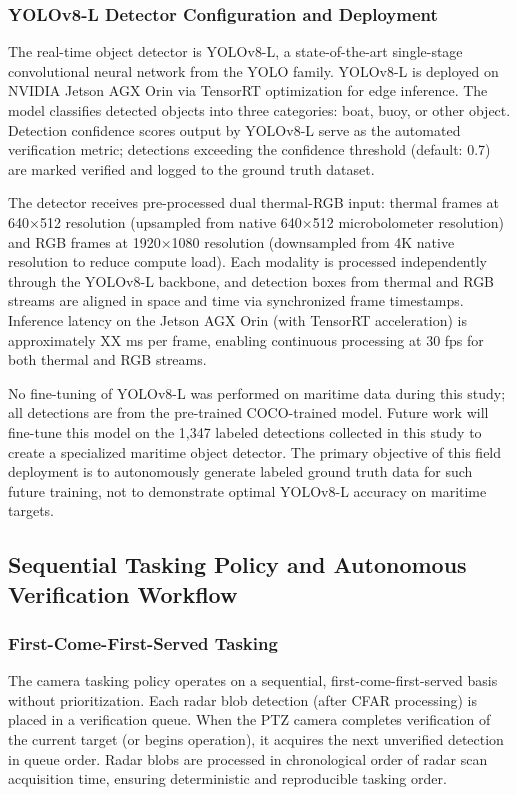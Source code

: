 \documentclass[conf]{asmeconf}
\begin{document}
\subsubsection{YOLOv8-L Detector Configuration and Deployment}

The real-time object detector is YOLOv8-L, a state-of-the-art single-stage convolutional neural network from the YOLO family. YOLOv8-L is deployed on NVIDIA Jetson AGX Orin via TensorRT optimization for edge inference. The model classifies detected objects into three categories: boat, buoy, or other object. Detection confidence scores output by YOLOv8-L serve as the automated verification metric; detections exceeding the confidence threshold (default: 0.7) are marked verified and logged to the ground truth dataset.

The detector receives pre-processed dual thermal-RGB input: thermal frames at 640×512 resolution (upsampled from native 640×512 microbolometer resolution) and RGB frames at 1920×1080 resolution (downsampled from 4K native resolution to reduce compute load). Each modality is processed independently through the YOLOv8-L backbone, and detection boxes from thermal and RGB streams are aligned in space and time via synchronized frame timestamps. Inference latency on the Jetson AGX Orin (with TensorRT acceleration) is approximately XX ms per frame, enabling continuous processing at 30 fps for both thermal and RGB streams.

No fine-tuning of YOLOv8-L was performed on maritime data during this study; all detections are from the pre-trained COCO-trained model. Future work will fine-tune this model on the 1,347 labeled detections collected in this study to create a specialized maritime object detector. The primary objective of this field deployment is to autonomously generate labeled ground truth data for such future training, not to demonstrate optimal YOLOv8-L accuracy on maritime targets.

\subsection{Sequential Tasking Policy and Autonomous Verification Workflow}

\subsubsection{First-Come-First-Served Tasking}

The camera tasking policy operates on a sequential, first-come-first-served basis without prioritization. Each radar blob detection (after CFAR processing) is placed in a verification queue. When the PTZ camera completes verification of the current target (or begins operation), it acquires the next unverified detection in queue order. Radar blobs are processed in chronological order of radar scan acquisition time, ensuring deterministic and reproducible tasking order.
\end{document}
